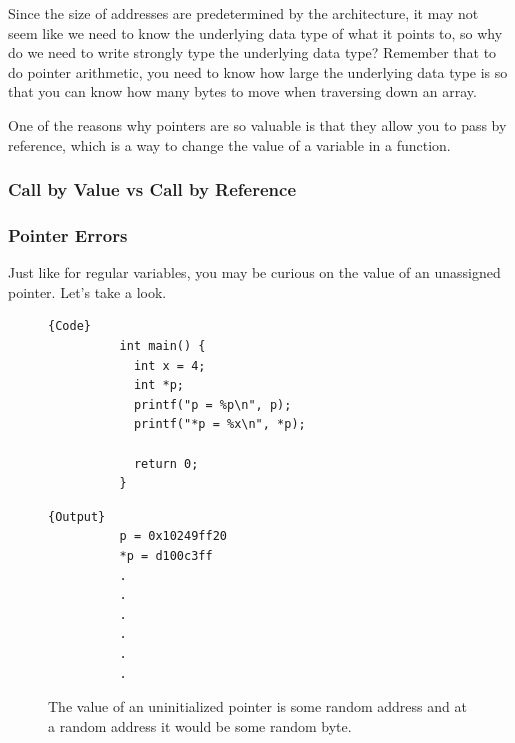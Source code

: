 \documentclass{article}
\begin{document}
    Since the size of addresses are predetermined by the architecture, it may not seem like we need to know the underlying data type of what it points to, so why do we need to write strongly type the underlying data type? Remember that to do pointer arithmetic, you need to know how large the underlying data type is so that you can know how many bytes to move when traversing down an array. 

    One of the reasons why pointers are so valuable is that they allow you to pass by reference, which is a way to change the value of a variable in a function. 

    \subsubsection{Call by Value vs Call by Reference}

      \begin{definition}
        
      \end{definition}

      \begin{definition}
        
      \end{definition}
    
    \subsubsection{Pointer Errors}

      Just like for regular variables, you may be curious on the value of an unassigned pointer. Let's take a look. 

      \begin{example}
      \begin{figure}[H]
        \centering 
        \noindent\begin{minipage}{.5\textwidth}
        \begin{lstlisting}[]{Code}
          int main() { 
            int x = 4; 
            int *p; 
            printf("p = %p\n", p); 
            printf("*p = %x\n", *p); 

            return 0; 
          }
        \end{lstlisting}
        \end{minipage}
        \hfill
        \begin{minipage}{.49\textwidth}
        \begin{lstlisting}[]{Output}
          p = 0x10249ff20
          *p = d100c3ff
          .
          .
          .
          .
          .
          .
        \end{lstlisting}
        \end{minipage}
        \caption{The value of an uninitialized pointer is some random address and at a random address it would be some random byte. } 
        \label{fig:uninitialized_pointer}
      \end{figure}
      \end{example}
\end{document}
